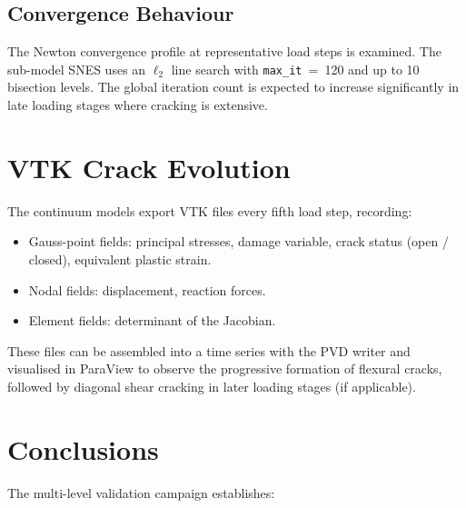 \subsection{Convergence Behaviour}
\label{ssec:v2-twoway-convergence}

The Newton convergence profile at representative load steps is
examined.  The sub-model SNES uses an $\ell_2$ line search with
\texttt{max\_it}~=~120 and up to 10 bisection levels.
The global iteration count is expected to increase significantly
in late loading stages where cracking is extensive.


\section{VTK Crack Evolution}
\label{sec:v2-vtk}

The continuum models export VTK files every fifth load step, recording:
\begin{itemize}
  \item Gauss-point fields: principal stresses, damage variable,
        crack status (open / closed), equivalent plastic strain.
  \item Nodal fields: displacement, reaction forces.
  \item Element fields: determinant of the Jacobian.
\end{itemize}
These files can be assembled into a time series with the PVD writer
and visualised in ParaView to observe the progressive formation of
flexural cracks, followed by diagonal shear cracking in later
loading stages (if applicable).


\section{Conclusions}
\label{sec:v2-conclusions}

The multi-level validation campaign establishes:

